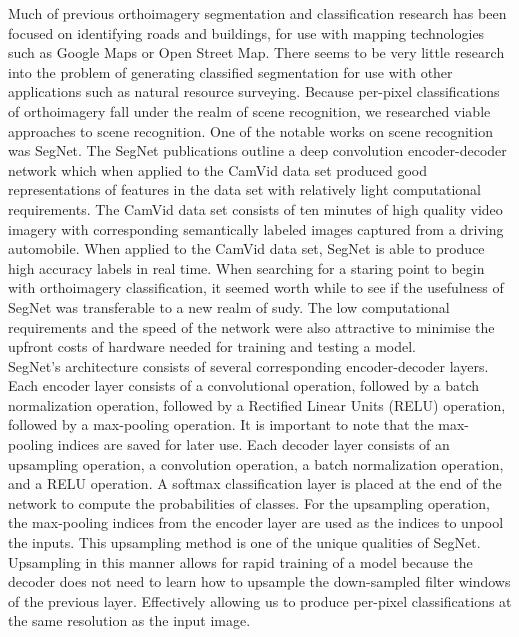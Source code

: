 \documentclass[12pt]{article}
\begin{document}
Much of previous orthoimagery segmentation and classification research has been focused on identifying roads and buildings, for use with mapping technologies such as Google Maps or Open Street Map. There seems to be very little research into the problem of generating classified segmentation for use with other applications such as natural resource surveying. Because per-pixel classifications of orthoimagery fall under the realm of scene recognition, we researched viable approaches to scene recognition. One of the notable works on scene recognition was SegNet. The SegNet publications outline a deep convolution encoder-decoder network which when applied to the CamVid data set produced good representations of features in the data set with relatively light computational requirements. The CamVid data set consists of ten minutes of high quality video imagery with corresponding semantically labeled images captured from a driving automobile. When applied to the CamVid data set, SegNet is able to produce high accuracy labels in real time. When searching for a staring point to begin with orthoimagery classification, it seemed worth while to see if the usefulness of SegNet was transferable to a new realm of sudy. The low computational requirements and the speed of the network were also attractive to minimise the upfront costs of hardware needed for training and testing a model.
\\

SegNet's architecture\cite{SegNet} consists of several corresponding encoder-decoder layers. Each encoder layer consists of a convolutional operation, followed by a batch normalization operation, followed by a Rectified Linear Units (RELU) operation, followed by a max-pooling operation. It is important to note that the max-pooling indices are saved for later use. Each decoder layer consists of an upsampling operation, a convolution operation, a batch normalization operation, and a RELU operation. A softmax classification layer is placed at the end of the network to compute the probabilities of classes. For the upsampling operation, the max-pooling indices from the encoder layer are used as the indices to unpool the inputs. This upsampling method is one of the unique qualities of SegNet. Upsampling in this manner allows for rapid training of a model because the decoder does not need to learn how to upsample the down-sampled filter windows of the previous layer. Effectively allowing us to produce per-pixel classifications at the same resolution as the input image.
\end{document}
